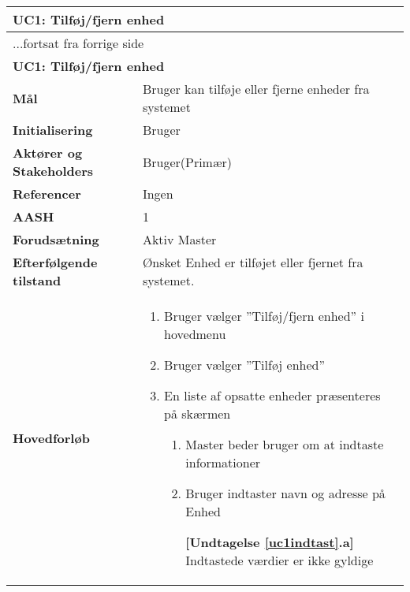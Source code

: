 \begin{center} \centering \label{UC1}
	\begin{longtable}{|p{5cm}|p{9cm}|}  %
	\hline
		\multicolumn{2}{|l|}{\textbf{UC1: Tilføj\slash fjern enhed}} \\\hline %
		\endfirsthead
		
		\multicolumn{2}{l}{...fortsat fra forrige side} \\ \hline %
		\multicolumn{2}{|l|}{\textbf{UC1: Tilføj\slash fjern enhed}} \\\hline %
		\endhead	
		
		\textbf{Mål}								&Bruger kan tilføje eller fjerne enheder fra systemet			\\\hline
		\textbf{Initialisering}					&Bruger														\\\hline
		\textbf{Aktører og Stakeholders}			&Bruger(Primær)												\\\hline 
		\textbf{Referencer}						&Ingen														\\\hline
		\textbf{AASH}							&1															\\\hline
		\textbf{Forudsætning}					&Aktiv Master											\\\hline
		\textbf{Efterfølgende tilstand}			&Ønsket Enhed er tilføjet eller fjernet fra systemet.		\\\hline
		\textbf{Hovedforløb}					
			&\begin{enumerate}
	
				\item Bruger vælger ''Tilføj/fjern enhed'' i hovedmenu
				
				\item Bruger vælger ''Tilføj enhed''
				
				\item En liste af opsatte enheder præsenteres på skærmen				
				
				\begin{enumerate}
					\item \label{uc1indtast} Master beder bruger om at indtaste informationer
					
					\item \label{uc1indtast_fejl} Bruger indtaster navn og adresse på Enhed
					
						\textbf{[Undtagelse \ref{uc1indtast}.a]} \newline
						Indtastede værdier er ikke gyldige
					

\end{enumerate}
\end{enumerate}
\end{longtable}
\end{center}
